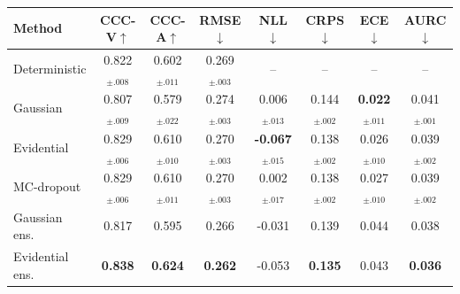 \begin{tabular}{lccccccc}
\toprule
Method & CCC-V$\uparrow$ & CCC-A$\uparrow$ & RMSE$\downarrow$ & NLL$\downarrow$ & CRPS$\downarrow$ & ECE$\downarrow$ & AURC$\downarrow$ \\
\midrule
Deterministic & 0.822$_{\pm.008}$ & 0.602$_{\pm.011}$ & 0.269$_{\pm.003}$ & -- & -- & -- & -- \\
Gaussian & 0.807$_{\pm.009}$ & 0.579$_{\pm.022}$ & 0.274$_{\pm.003}$ & 0.006$_{\pm.013}$ & 0.144$_{\pm.002}$ & \textbf{0.022}$_{\pm.011}$ & 0.041$_{\pm.001}$ \\
Evidential & 0.829$_{\pm.006}$ & 0.610$_{\pm.010}$ & 0.270$_{\pm.003}$ & \textbf{-0.067}$_{\pm.015}$ & 0.138$_{\pm.002}$ & 0.026$_{\pm.010}$ & 0.039$_{\pm.002}$ \\
MC-dropout & 0.829$_{\pm.006}$ & 0.610$_{\pm.011}$ & 0.270$_{\pm.003}$ & 0.002$_{\pm.017}$ & 0.138$_{\pm.002}$ & 0.027$_{\pm.010}$ & 0.039$_{\pm.002}$ \\
Gaussian ens. & 0.817 & 0.595 & 0.266 & -0.031 & 0.139 & 0.044 & 0.038 \\
Evidential ens. & \textbf{0.838} & \textbf{0.624} & \textbf{0.262} & -0.053 & \textbf{0.135} & 0.043 & \textbf{0.036} \\
\bottomrule
\end{tabular}
